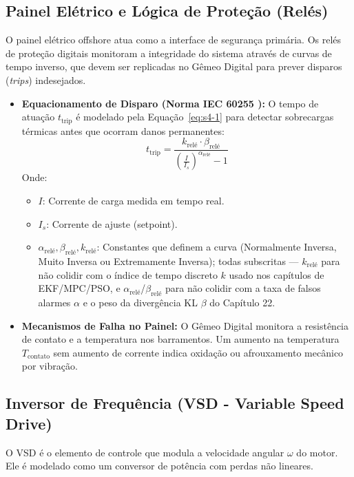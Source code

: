 \documentclass[12pt,a4paper]{article}
\numberwithin{equation}{section}
\numberwithin{table}{section}
\numberwithin{figure}{section}
\begin{document}
{	\subsection{\textbf{Painel Elétrico e Lógica de Proteção (Relés)}}
	O painel elétrico offshore atua como a interface de segurança primária. Os relés de proteção digitais monitoram a integridade do sistema através de curvas de tempo inverso, que devem ser replicadas no Gêmeo Digital para prever disparos (\textit{trips}) indesejados.
	
	\begin{itemize}
		\item \textbf{Equacionamento de Disparo (Norma IEC 60255 \cite{iec60255}):}
		O tempo de atuação $t_{\text{trip}}$ é modelado pela Equação~\eqref{eq:s4-1} para detectar sobrecargas térmicas antes que ocorram danos permanentes:
		\begin{equation}\label{eq:s4-1}
 t_{\text{trip}} = \frac{k_{\text{relé}} \cdot \beta_{\text{relé}}}{\left( \frac{I}{I_s} \right)^{\alpha_{\text{relé}}} - 1}
\end{equation}
		Onde:
		\begin{itemize}
			\item $I$: Corrente de carga medida em tempo real.
			\item $I_s$: Corrente de ajuste (setpoint).
			\item $\alpha_{\text{relé}}, \beta_{\text{relé}}, k_{\text{relé}}$: Constantes que definem a curva (Normalmente Inversa, Muito Inversa ou Extremamente Inversa); todas subscritas — $k_{\text{relé}}$ para não colidir com o índice de tempo discreto $k$ usado nos capítulos de EKF/MPC/PSO, e $\alpha_{\text{relé}}$/$\beta_{\text{relé}}$ para não colidir com a taxa de falsos alarmes $\alpha$ e o peso da divergência KL $\beta$ do Capítulo 22.
		\end{itemize}
		\item \textbf{Mecanismos de Falha no Painel:} O Gêmeo Digital monitora a resistência de contato e a temperatura nos barramentos. Um aumento na temperatura $T_{\text{contato}}$ sem aumento de corrente indica oxidação ou afrouxamento mecânico por vibração.
	\end{itemize}
	
	\subsection{\textbf{Inversor de Frequência (VSD - Variable Speed Drive)}}
	O VSD é o elemento de controle que modula a velocidade angular $\omega$ do motor. Ele é modelado como um conversor de potência com perdas não lineares.
	
}
\end{document}
